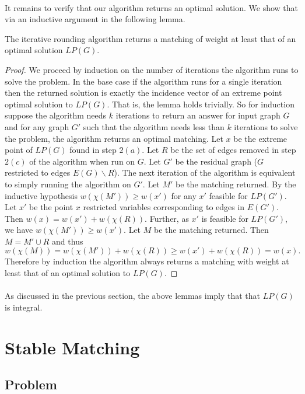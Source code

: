 \paragraph{}
It remains to verify that our algorithm returns an optimal solution. We show that via an inductive argument in the following lemma.
\begin{lemma}
The iterative rounding algorithm returns a matching of weight at least that of an optimal solution $LP(G)$.
\end{lemma}
\begin{proof}
We proceed by induction on the number of iterations the algorithm runs to solve the problem. In the base case if the algorithm runs for a single iteration then the returned solution is exactly the incidence vector of an extreme point optimal solution to $LP(G)$. That is, the lemma holds trivially. So for induction suppose the algorithm needs $k$ iterations to return an answer for input graph $G$ and for any graph $G'$ such that the algorithm needs less than $k$ iterations to solve the problem, the algorithm returns an optimal matching. Let $x$ be the extreme point of $LP(G)$ found in step $2(a)$. Let $R$ be the set of edges removed in step $2(c)$ of the algorithm when run on $G$. Let $G'$ be the residual graph ($G$ restricted to edges $E(G) \backslash R$). The next iteration of the algorithm is equivalent to simply running the algorithm on $G'$. Let $M'$ be the matching returned. By the inductive hypothesis $w(\chi(M')) \geq w(x')$ for any $x'$ feasible for $LP(G')$. Let $x'$ be the point $x$ restricted variables corresponding to edges in $E(G')$. Then $w(x) = w(x') + w(\chi(R))$. Further, as $x'$ is feasible for $LP(G')$, we have
$w(\chi(M')) \geq w(x')$. Let $M$ be the matching returned. Then $M = M' \cup R$ and thus
$$w(\chi(M)) = w(\chi(M')) + w(\chi(R)) \geq w(x') + w(\chi(R)) = w(x).$$
Therefore by induction the algorithm always returns a matching with weight at least that of an optimal solution to $LP(G)$. 
\end{proof}
\paragraph{}
As discussed in the previous section, the above lemmas imply that that $LP(G)$ is integral.
\section{Stable Matching}
\subsection{Problem}
